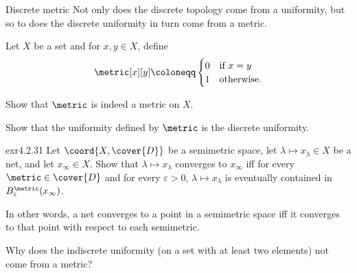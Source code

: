 \begin{exm}{Discrete metric}{}
Not only does the discrete topology come from a uniformity, but so to does the discrete uniformity in turn come from a metric.

Let $X$ be a set and for $x,y\in X$, define
\begin{equation}
\metric[x][y]\coloneqq \begin{cases}0 & \text{if }x=y \\ 1 & \text{otherwise.}\end{cases}
\end{equation}
\begin{exr}[breakable=false]{}{}
Show that $\metric$ is indeed a metric on $X$.
\end{exr}
\begin{exr}[breakable=false]{}{}
Show that the uniformity defined by $\metric$ is the discrete uniformity.
\end{exr}
\end{exm}
\begin{exr}{}{exr4.2.31}
Let $\coord{X,\cover{D}}$ be a semimetric space, let $\lambda \mapsto x_\lambda \in X$ be a net, and let $x_{\infty}\in X$.  Show that $\lambda \mapsto x_\lambda$ converges to $x_{\infty}$ iff for every $\metric \in \cover{D}$ and for every $\varepsilon >0$, $\lambda \mapsto x_\lambda$ is eventually contained in $B_{\varepsilon}^{\metric}(x_{\infty})$.
\begin{rmk}
In other words, a net converges to a point in a semimetric space iff it converges to that point with respect to each semimetric.
\end{rmk}
\end{exr}
\begin{exr}{}{}
Why does the indiscrete uniformity (on a set with at least two elements) not come from a metric?
\end{exr}

